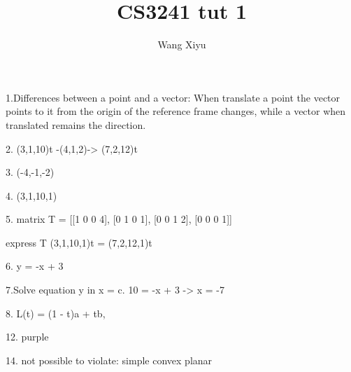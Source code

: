 \documentclass[a4paper]{article}
\begin{document}
\title{CS3241 tut 1}
\author{
  Wang Xiyu
}
\maketitle
1.Differences between a point and a vector: 
When translate a point the vector points to it from the origin of the reference frame changes, while a vector when translated remains the direction.

2. (3,1,10)t -(4,1,2)-> (7,2,12)t

3. (-4,-1,-2)

4. (3,1,10,1)

5. matrix T = 
[[1 0 0 4],
[0 1 0 1],
[0 0 1 2],
[0 0 0 1]]

express T (3,1,10,1)t = (7,2,12,1)t

6. y = -x + 3

7.Solve equation y in x = c.
10 = -x + 3 -> x = -7

8. L(t) = (1 - t)a + tb, 

12. purple

14. not possible to violate:
simple
convex 
planar
\end{document}
